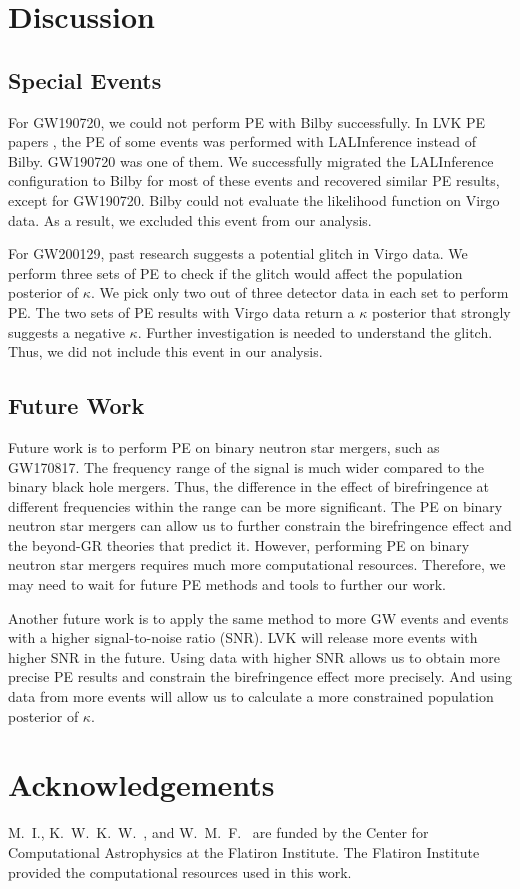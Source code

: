 \documentclass[aps,prd,twocolumn,superscriptaddress,preprintnumbers,floatfix,nofootinbib]{revtex4-2}
\begin{document}
\section{Discussion}
\label{sec:Discussion}

\subsection{Special Events}
For GW190720, we could not perform PE with Bilby successfully.
In LVK PE papers \citep{GWTC-2.1, GWTC-3}, the PE of some events was performed with LALInference \citep{lalsuite} instead of Bilby.
GW190720 was one of them.
We successfully migrated the LALInference configuration to Bilby for most of these events and recovered similar PE results, except for GW190720.
Bilby could not evaluate the likelihood function on Virgo data.
As a result, we excluded this event from our analysis.

For GW200129, past research suggests a potential glitch in Virgo data. \citep{GW200129}
We perform three sets of PE to check if the glitch would affect the population posterior of $\kappa$.
We pick only two out of three detector data in each set to perform PE.
The two sets of PE results with Virgo data return a $\kappa$ posterior that strongly suggests a negative $\kappa$.
Further investigation is needed to understand the glitch.
Thus, we did not include this event in our analysis.

\subsection{Future Work}
Future work is to perform PE on binary neutron star mergers, such as GW170817.
The frequency range of the signal is much wider compared to the binary black hole mergers.
Thus, the difference in the effect of birefringence at different frequencies within the range can be more significant.
The PE on binary neutron star mergers can allow us to further constrain the birefringence effect and the beyond-GR theories that predict it.
However, performing PE on binary neutron star mergers requires much more computational resources.
Therefore, we may need to wait for future PE methods and tools to further our work.

Another future work is to apply the same method to more GW events and events with a higher signal-to-noise ratio (SNR).
LVK will release more events with higher SNR in the future.
Using data with higher SNR allows us to obtain more precise PE results and constrain the birefringence effect more precisely.
And using data from more events will allow us to calculate a more constrained population posterior of $\kappa$.

\section{Acknowledgements}
\label{sec:Acknowledgements}
M.~I., K.~W.~K.~W.~, and W.~M.~F.~ are funded by the Center for Computational Astrophysics at the Flatiron Institute.
The Flatiron Institute provided the computational resources used in this work.


\end{document}

